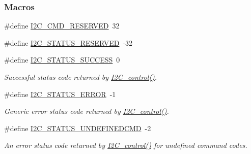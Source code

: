 \subsubsection*{Macros}
\begin{DoxyCompactItemize}
\item 
\#define \hyperlink{_i2_c_8h_a760ec0a6fdb876ccc67b6f06301d53ec}{I2\+C\+\_\+\+C\+M\+D\+\_\+\+R\+E\+S\+E\+R\+V\+E\+D}~32
\item 
\#define \hyperlink{_i2_c_8h_acfd04572fe349d087c2547501cbc7e0a}{I2\+C\+\_\+\+S\+T\+A\+T\+U\+S\+\_\+\+R\+E\+S\+E\+R\+V\+E\+D}~-\/32
\item 
\#define \hyperlink{_i2_c_8h_aa0bcf3acd26ac82bd8ff91daba2c78c4}{I2\+C\+\_\+\+S\+T\+A\+T\+U\+S\+\_\+\+S\+U\+C\+C\+E\+S\+S}~0
\begin{DoxyCompactList}\small\item\em Successful status code returned by \hyperlink{_i2_c_8h_a633003582213a5098467a4e647cc52f9}{I2\+C\+\_\+control()}. \end{DoxyCompactList}\item 
\#define \hyperlink{_i2_c_8h_a7323fe57c39c46d0da9910e17f5f0b06}{I2\+C\+\_\+\+S\+T\+A\+T\+U\+S\+\_\+\+E\+R\+R\+O\+R}~-\/1
\begin{DoxyCompactList}\small\item\em Generic error status code returned by \hyperlink{_i2_c_8h_a633003582213a5098467a4e647cc52f9}{I2\+C\+\_\+control()}. \end{DoxyCompactList}\item 
\#define \hyperlink{_i2_c_8h_a11c31c9869ed2441789205d9e5967d66}{I2\+C\+\_\+\+S\+T\+A\+T\+U\+S\+\_\+\+U\+N\+D\+E\+F\+I\+N\+E\+D\+C\+M\+D}~-\/2
\begin{DoxyCompactList}\small\item\em An error status code returned by \hyperlink{_i2_c_8h_a633003582213a5098467a4e647cc52f9}{I2\+C\+\_\+control()} for undefined command codes. \end{DoxyCompactList}\end{DoxyCompactItemize}
